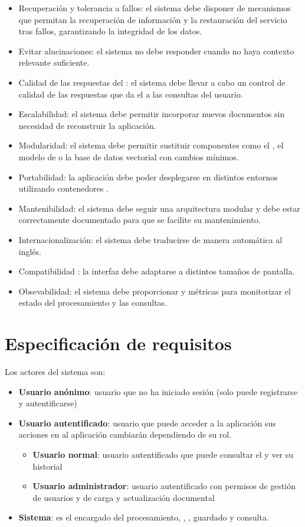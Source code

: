 \begin{itemize}
	\item {} Recuperación y tolerancia a fallos: el sistema debe disponer de mecanismos que permitan la recuperación de información y la restauración del servicio tras fallos, garantizando la integridad de los datos.
	\item {} Evitar alucinaciones: el sistema no debe responder cuando no haya contexto relevante suficiente.
	\item {} Calidad de las respuestas del : el sistema debe llevar a cabo un control de calidad de las respuestas que da el  a las consultas del usuario.
	\item {} Escalabilidad: el sistema debe permitir incorporar nuevos documentos sin necesidad de reconstruir la aplicación.
	\item {} Modularidad: el sistema debe permitir sustituir componentes como el , el modelo de  o la base de datos vectorial con cambios mínimos.
	\item {} Portabilidad: la aplicación debe poder desplegarse en distintos entornos utilizando contenedores .
	\item {} Mantenibilidad: el sistema debe seguir una arquitectura modular y debe estar correctamente documentado para que se facilite su mantenimiento.
	\item {} Internacionalización: el sistema debe traducirse de manera automática al inglés.
	\item {} Compatibilidad : la interfaz debe adaptarse a distintos tamaños de pantalla.
	\item {} Obsevabilidad: el sistema debe proporcionar  y métricas para monitorizar el estado del procesamiento y las consultas.
\end{itemize}

\section{Especificación de requisitos} \label{req:esp}

Los actores del sistema son:
\begin{itemize}
\tightlist
	\item \textbf{Usuario anónimo}: usuario que no ha iniciado sesión (solo puede registrarse y autentificarse)
	\item \textbf{Usuario autentificado}: usuario que puede acceder a la aplicación sus acciones en al aplicación cambiarán dependiendo de su rol. 
	\begin{itemize}
	\tightlist
	 	\item \textbf{Usuario normal}: usuario autentificado que puede consultar el  y ver su historial
	 	\item \textbf{Usuario administrador}: usuario autentificado con permisos de gestión de usuarios y de carga y actualización documental
	 \end{itemize}
	 \item \textbf{Sistema}: es el encargado del procesamiento, , , guardado y consulta. 
\end{itemize}


